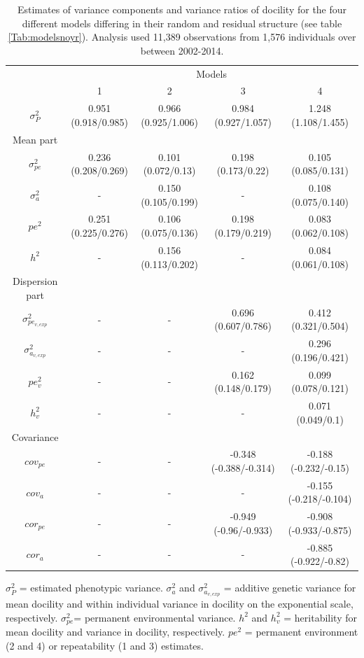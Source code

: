 \documentclass[a4paper,12pt,twoside]{article}
\begin{document}
	\begin{table}[h!]
		\caption{Estimates of variance components and variance ratios of docility for the four different models differing in their random and residual structure (see table \ref{Tab:modelsnoyr}). 
			Analysis used 11,389 observations from 1,576 individuals over between 2002-2014.}
		\label{Tab:estimatesnoyr}
		\centering
		\small
		\begin{tabular}{c c c c c}
			\hline
			\multicolumn{1}{c}{} &
			\multicolumn{4}{c}{Models}\\
			& 1 & 2 & 3 & 4\\
			\hline
			$\sigma_P^2$ & 0.951 (0.918/0.985) & 0.966 (0.925/1.006) & 0.984 (0.927/1.057) & 1.248 (1.108/1.455)\\
			Mean part & & & &\\
			$\sigma_{pe}^2$ & 0.236 (0.208/0.269) & 0.101 (0.072/0.13) & 0.198 (0.173/0.22) & 0.105 (0.085/0.131)\\
			$\sigma_{a}^2$ & - & 0.150 (0.105/0.199) & - & 0.108 (0.075/0.140) \\
			$pe^2$ & 0.251 (0.225/0.276) & 0.106 (0.075/0.136) & 0.198 (0.179/0.219) & 0.083 (0.062/0.108)\\
			$h^2$ & - & 0.156 (0.113/0.202) & - & 0.084 (0.061/0.108)\\
			Dispersion part & & & &\\
			$\sigma_{pe_{v, exp}}^2$ & - & - & 0.696 (0.607/0.786) & 0.412 (0.321/0.504)\\
			$\sigma_{a_{v, exp}}^2$ & - & - & - & 0.296 (0.196/0.421)\\
			$pe_v^2$ & - & - & 0.162 (0.148/0.179) & 0.099 (0.078/0.121)\\
			$h_v^2$ & - & - & - & 0.071 (0.049/0.1)\\
			Covariance & & & &\\
			$cov_{pe}$ & - & - & -0.348 (-0.388/-0.314) & -0.188 (-0.232/-0.15)\\
			$cov_{a}$ & - & - & - & -0.155 (-0.218/-0.104)\\
			$cor_{pe}$ & - & - & -0.949 (-0.96/-0.933) & -0.908 (-0.933/-0.875)\\
			$cor_{a}$ & - & - & - & -0.885 (-0.922/-0.82)\\
			\hline
		\end{tabular}
		\begin{tablenotes}
			\small
			\item $\sigma_P^2$ = estimated phenotypic variance. 
			$\sigma_a^2$ and $\sigma_{a_{v, exp}}^2$ = additive genetic variance for mean docility and within individual variance in docility on the exponential scale, respectively. 
			$\sigma_{pe}^2$= permanent environmental variance. 
			$h^2$ and $h_v^2$ = heritability for mean docility and variance in docility, respectively. 
			$pe^2$ = permanent environment (2 and 4) or repeatability (1 and 3) estimates.
		\end{tablenotes}
	\end{table}
	
\end{document}

